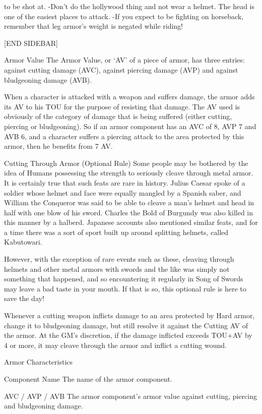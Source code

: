\documentclass[oneside,11pt,english]{book}
\begin{document}
to be shot at.
-Don’t do the hollywood thing and not wear a helmet. The head is one of the easiest places to attack.
-If you expect to be fighting on horseback, remember that leg armor’s weight is negated while riding!

[END SIDEBAR]

Armor Value
The Armor Value, or ‘AV’ of a piece of armor, has three entries: against cutting damage (AVC), against piercing 
damage (AVP) and against bludgeoning damage (AVB).

When a character is attacked with a weapon and suffers damage, the armor adds its AV to his TOU for the purpose of 
resisting that damage. The AV used is obviously of the category of damage that is being suffered (either cutting, 
piercing or bludgeoning). So if an armor component has an AVC of 8, AVP 7 and AVB 6, and a character suffers a 
piercing attack to the area protected by this armor, then he benefits from 7 AV.

Cutting Through Armor (Optional Rule)
Some people may be bothered by the idea of Humans possessing the strength to seriously cleave through metal armor. 
It is certainly true that such feats are rare in history. Julius Caesar spoke of a soldier whose helmet and face were 
equally mangled by a Spanish saber, and William the Conqueror was said to be able to cleave a man’s helmet and 
head in half with one blow of his sword. Charles the Bold of Burgundy was also killed in this manner by a halberd. 
Japanese accounts also mentioned similar feats, and for a time there was a sort of sport built up around splitting 
helmets, called Kabutowari. 

However, with the exception of rare events such as these, cleaving through helmets and other metal armors with 
swords and the like was simply not something that happened, and so encountering it regularly in Song of Swords may 
leave a bad taste in your mouth. If that is so, this optional rule is here to save the day! 

Whenever a cutting weapon inflicts damage to an area protected by Hard armor, change it to bludgeoning damage, but
still resolve it against the Cutting AV of the armor. At the GM’s discretion, if the damage inflicted exceeds TOU+AV 
by 4 or more, it may cleave through the armor and inflict a cutting wound.


Armor Characteristics

Component Name
The name of the armor component.

AVC / AVP / AVB
The armor component’s armor value against cutting, piercing and bludgeoning damage.
\end{document}
